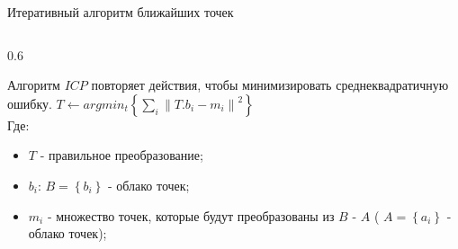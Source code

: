 \documentclass[10pt,pdf,hyperref={unicode},xcolor=table]{beamer}
\begin{document}
\begin{frame}{Итеративный алгоритм ближайших точек}
\begin{columns}
\begin{column} {0.6\textwidth}
\begin{block}{}
\begin{itemize}
\end{itemize}
	\end{block}
	Алгоритм $ICP$ повторяет действия, чтобы минимизировать среднеквадратичную ошибку.
$ T\leftarrow argmin_t\left\{\sum_i\left\|T.b_i - m_i\right\|^2\right\}$\\
Где:
\begin{itemize}
	\item $T$ - правильное преобразование;
	\item $b_i$: $B=\left\{b_i\right\}$ - облако точек;
	\item $m_i$ - множество точек, которые будут преобразованы из $B$ - $A$ ( $A=\left\{a_i\right\}$ - облако точек);
\end{itemize}
			\end{column}      
		\end{columns}	
\end{frame}
\end{document}
